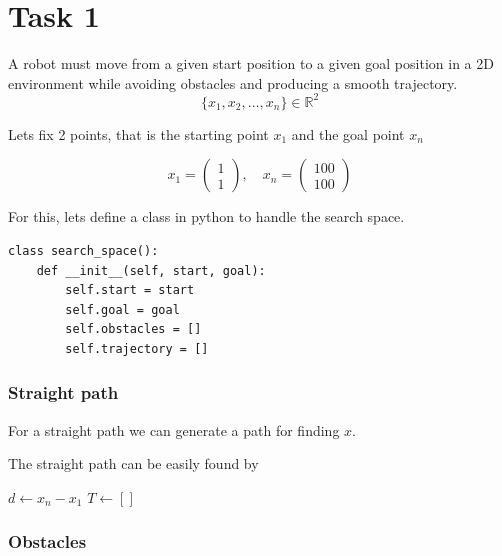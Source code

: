 \documentclass[a4paper,11pt]{article}
\begin{document}
\newpage
\section{Task 1}
A robot must move from a given start position to a given goal position
in a 2D environment while avoiding obstacles and producing a smooth trajectory.
$$ \{x_1,x_2,\dots,x_n\} \in \mathbb{R}^2 $$



Lets fix 2 points, that is the starting point $x_1$ and the goal point $x_n$

$$x_1 = \begin{pmatrix}1\\1\end{pmatrix}, \quad x_n = \begin{pmatrix}100\\100\end{pmatrix}$$

For this, lets define a class in python to handle the search space.

\begin{lstlisting}
class search_space():
    def __init__(self, start, goal):
        self.start = start
        self.goal = goal
        self.obstacles = []
        self.trajectory = []
\end{lstlisting}

\subsubsection{Straight path}
For a straight path we can generate a path for finding $x$.

The straight path can be easily found by

\begin{algorithm}[htb]
        $d \leftarrow x_n - x_1$\;
        $T \leftarrow []$\;
        \;
        \caption{Straight path}
\end{algorithm}

\pagebreak

\subsubsection{Obstacles}
\end{document}
